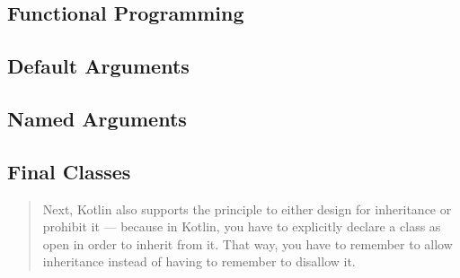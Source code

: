 \documentclass[12pt,a4paper]{report}
\begin{document}
\subsection{Functional Programming}

\subsection{Default Arguments}

\subsection{Named Arguments}

\subsection{Final Classes}

\begin{quotation}
Next, Kotlin also supports the principle to either design for inheritance or prohibit it — because in Kotlin, you have to explicitly declare a class as open in order to inherit from it. That way, you have to remember to allow inheritance instead of having to remember to disallow it.\cite{kotlin-sommerhoff}
\end{quotation}

\listoffigures
\end{document}
